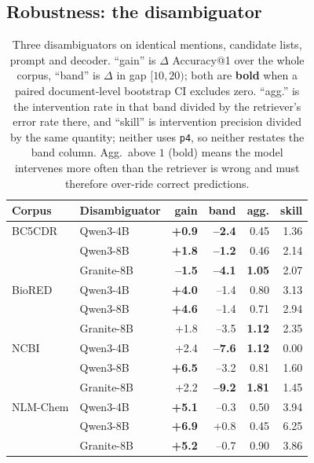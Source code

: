 \documentclass[11pt]{article}
\makeatletter
\newcommand{\acc}{Accuracy@1}
\makeatother
\begin{document}
\subsection{Robustness: the disambiguator}\label{sec:models}

\begin{table}[t]
\centering\small
\setlength{\tabcolsep}{3.2pt}
\begin{tabular}{llrrrr}
\toprule
Corpus & Disambiguator & gain & band & agg. & skill \\
\midrule
BC5CDR & Qwen3-4B & \textbf{+0.9} & \textbf{--2.4} & 0.45 & 1.36 \\
 & Qwen3-8B & \textbf{+1.8} & \textbf{--1.2} & 0.46 & 2.14 \\
 & Granite-8B & \textbf{--1.5} & \textbf{--4.1} & \textbf{1.05} & 2.07 \\
\addlinespace[1pt]
BioRED & Qwen3-4B & \textbf{+4.0} & --1.4 & 0.80 & 3.13 \\
 & Qwen3-8B & \textbf{+4.6} & --1.4 & 0.71 & 2.94 \\
 & Granite-8B & +1.8 & --3.5 & \textbf{1.12} & 2.35 \\
\addlinespace[1pt]
NCBI & Qwen3-4B & +2.4 & \textbf{--7.6} & \textbf{1.12} & 0.00 \\
 & Qwen3-8B & \textbf{+6.5} & --3.2 & 0.81 & 1.60 \\
 & Granite-8B & +2.2 & \textbf{--9.2} & \textbf{1.81} & 1.45 \\
\addlinespace[1pt]
NLM-Chem & Qwen3-4B & \textbf{+5.1} & --0.3 & 0.50 & 3.94 \\
 & Qwen3-8B & \textbf{+6.9} & +0.8 & 0.45 & 6.25 \\
 & Granite-8B & \textbf{+5.2} & --0.7 & 0.90 & 3.86 \\
\bottomrule
\end{tabular}
\caption{Three disambiguators on identical mentions, candidate lists, prompt and
decoder. ``gain'' is $\Delta$ \acc{} over the whole corpus, ``band'' is $\Delta$ in gap
$[10,20)$; both are \textbf{bold} when a paired document-level bootstrap CI excludes
zero. ``agg.'' is the intervention rate in that band divided by the retriever's error
rate there, and ``skill'' is intervention precision divided by the same quantity;
neither uses \texttt{p4}, so neither restates the band column. Agg.\ above $1$ (bold)
means the model intervenes more often than the retriever is wrong and must therefore
over-ride correct predictions.}
\label{tab:models}
\end{table}
\end{document}
